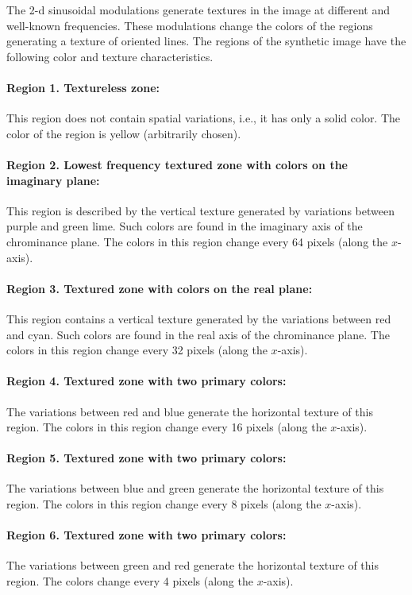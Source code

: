 The 2-d sinusoidal modulations generate textures in the image at different and well-known frequencies. These modulations change the colors of the regions generating a texture of oriented lines. The regions of the synthetic image have the following color and texture characteristics.

\paragraph{Region 1. Textureless zone:}
This region does not contain spatial variations, i.e., it has only a solid color. The color of the region is yellow (arbitrarily chosen).

\paragraph{Region 2. Lowest frequency textured zone with colors on the imaginary plane:}
This region is described by the vertical texture generated by variations between purple and green lime. Such colors are found in the imaginary axis of the chrominance plane. The colors in this region change every 64 pixels (along the $x$-axis).

\paragraph{Region 3. Textured zone with colors on the real plane:}
This region contains a vertical texture generated by the variations between red and cyan. Such colors are found in the real axis of the chrominance plane. The colors in this region change every 32 pixels (along the $x$-axis).

\paragraph{Region 4. Textured zone with two primary colors:}
The variations between red and blue generate the horizontal texture of this region. The colors in this region change every 16 pixels (along the $x$-axis). 

\paragraph{Region 5. Textured zone with two primary colors:}
The variations between blue and green generate the horizontal texture of this region. The colors in this region change every 8 pixels (along the $x$-axis). 

\paragraph{Region 6. Textured zone with two primary colors:}
The variations between green and red generate the horizontal texture of this region. The colors change every 4 pixels (along the $x$-axis).


